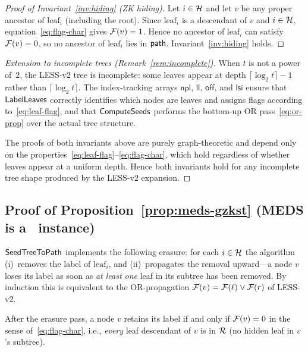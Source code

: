\begin{proof}[Proof of Invariant~\ref{inv:hiding} (ZK hiding)]
Let $i \in \mathcal{H}$ and let $v$ be any proper ancestor of $\mathrm{leaf}_i$
(including the root).  Since $\mathrm{leaf}_i$ is a descendant of $v$ and
$i \in \mathcal{H}$, equation~\eqref{eq:flag-char} gives $\mathcal{F}(v) = 1$.
Hence no ancestor of $\mathrm{leaf}_i$ can satisfy $\mathcal{F}(v) = 0$, so no
ancestor of $\mathrm{leaf}_i$ lies in $\mathsf{path}$.  Invariant~\ref{inv:hiding}
holds.
\end{proof}

\begin{proof}[Extension to incomplete trees (Remark~\ref{rem:incomplete})]
When $t$ is not a power of~$2$, the LESS-v2 tree is incomplete: some leaves
appear at depth $\lceil \log_2 t \rceil - 1$ rather than $\lceil \log_2 t \rceil$.
The index-tracking arrays $\mathsf{npl}$, $\mathsf{ll}$, $\mathsf{off}$, and
$\mathsf{lsi}$ ensure that $\mathsf{LabelLeaves}$ correctly identifies which nodes are
leaves and assigns flags according to~\eqref{eq:leaf-flag}, and that
$\mathsf{ComputeSeeds}$ performs the bottom-up OR pass~\eqref{eq:or-prop} over the
actual tree structure.

The proofs of both invariants above are purely graph-theoretic and depend only
on the properties~\eqref{eq:leaf-flag}--\eqref{eq:flag-char}, which hold
regardless of whether leaves appear at a uniform depth.  Hence both invariants
hold for any incomplete tree shape produced by the LESS-v2 expansion.
\end{proof}

\subsection{Proof of Proposition~\ref{prop:meds-gzkst}
  (MEDS is a \GZKST\ instance)}
\label{app:proof-meds}

$\mathsf{SeedTreeToPath}$ implements the following erasure: for each $i \in \mathcal{H}$
the algorithm (i)~removes the label of $\mathrm{leaf}_i$, and
(ii)~propagates the removal upward---a node $v$ loses its label as soon as
\emph{at least one} leaf in its subtree has been removed.
By induction this is equivalent to the OR-propagation
$\mathcal{F}(v) = \mathcal{F}(\ell) \vee \mathcal{F}(r)$ of LESS-v2.

\begin{claim}
\label{claim:meds-retain}
After the erasure pass, a node $v$ retains its label if and only if
$\mathcal{F}(v) = 0$ in the sense of~\eqref{eq:flag-char},
i.e., \emph{every} leaf descendant of $v$ is in $\mathcal{R}$ (no hidden leaf
in $v$'s subtree).
\end{claim}

